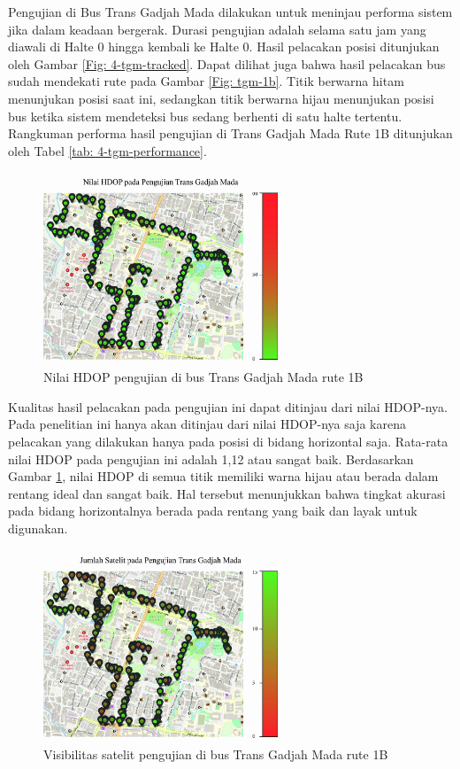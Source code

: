 \documentclass[conference]{IEEEtran}
\begin{document}
Pengujian di Bus Trans Gadjah Mada dilakukan untuk meninjau performa sistem jika dalam keadaan bergerak. Durasi pengujian adalah selama satu jam yang diawali di Halte 0 hingga kembali ke Halte 0. Hasil pelacakan posisi ditunjukan oleh Gambar \ref{Fig: 4-tgm-tracked}. Dapat dilihat juga bahwa hasil pelacakan bus sudah mendekati rute pada Gambar \ref{Fig: tgm-1b}. Titik berwarna hitam menunjukan posisi saat ini, sedangkan titik berwarna hijau menunjukan posisi bus ketika sistem mendeteksi bus sedang berhenti di satu halte tertentu. Rangkuman performa hasil pengujian di Trans Gadjah Mada Rute 1B ditunjukan oleh Tabel \ref{tab: 4-tgm-performance}.

\begin{figure}[htb!]
	\centering
	\includegraphics[width=7cm]{moving-HDOP.jpg}
	\caption{Nilai HDOP pengujian di bus Trans Gadjah Mada rute 1B}
	\label{Fig: 4-tgm-hdop}
\end{figure}

Kualitas hasil pelacakan pada pengujian ini dapat ditinjau dari nilai HDOP-nya. Pada penelitian ini hanya akan ditinjau dari nilai HDOP-nya saja karena pelacakan yang dilakukan hanya pada posisi di bidang horizontal saja. Rata-rata nilai HDOP pada pengujian ini adalah 1,12 atau sangat baik. Berdasarkan Gambar \ref{Fig: 4-tgm-hdop}, nilai HDOP di semua titik memiliki warna hijau atau berada dalam rentang ideal dan sangat baik. Hal tersebut menunjukkan bahwa tingkat akurasi pada bidang horizontalnya berada pada rentang yang baik dan layak untuk digunakan.

\begin{figure}[htb!]
	\centering
	\includegraphics[width=7cm]{moving-SATS.jpg}
	\caption{Visibilitas satelit pengujian di bus Trans Gadjah Mada rute 1B}
	\label{Fig: 4-tgm-sats}
\end{figure}
\end{document}
